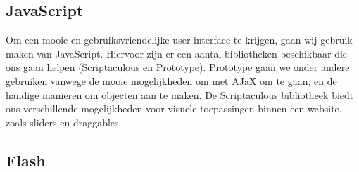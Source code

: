 \subsection{JavaScript}
Om een mooie en gebruiksvriendelijke user-interface te krijgen, gaan wij gebruik maken van JavaScript.
Hiervoor zijn er een aantal bibliotheken beschikbaar die ons gaan helpen (Scriptaculous\cite{scriptaculous} en Prototype\cite{prototype}).
Prototype gaan we onder andere gebruiken vanwege de mooie mogelijkheden om met AJaX om te gaan, en de handige manieren om objecten aan te maken.
De Scriptaculous bibliotheek biedt ons verschillende mogelijkheden voor visuele toepassingen binnen een website, zoals sliders en draggables

\subsection{Flash}
